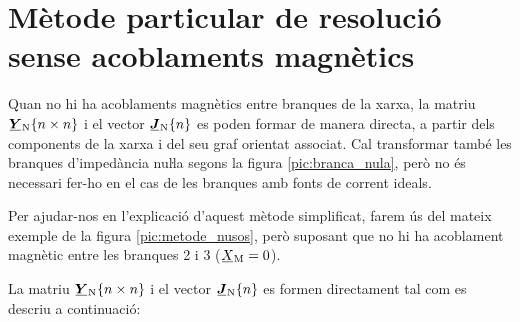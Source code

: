 \section{Mètode particular de resolució sense acoblaments magnètics}

Quan no hi ha acoblaments magnètics entre branques de la xarxa, la matriu $\mcmplx{Y}\ped{N}\{n \times n\}$ i el vector $\mcmplx{J}\ped{N}\{n\}$ es poden formar de manera directa, a partir dels components de la xarxa i del seu graf orientat associat. Cal transformar també les branques d'impedància nuŀla segons la figura
\vref{pic:branca_nula}, però no és necessari fer-ho en el cas de les branques amb fonts de corrent ideals.

Per ajudar-nos en l'explicació d'aquest mètode simplificat, farem ús
del mateix exemple de la figura \vref{pic:metode_nusos}, però
suposant que no hi ha acoblament magnètic entre les branques 2 i 3
($\cmplx{X}\ped{M}=0$).

La matriu $\mcmplx{Y}\ped{N}\{n \times n\}$ i el vector $\mcmplx{J}\ped{N}\{n\}$ es formen directament tal com es descriu a continuació:

